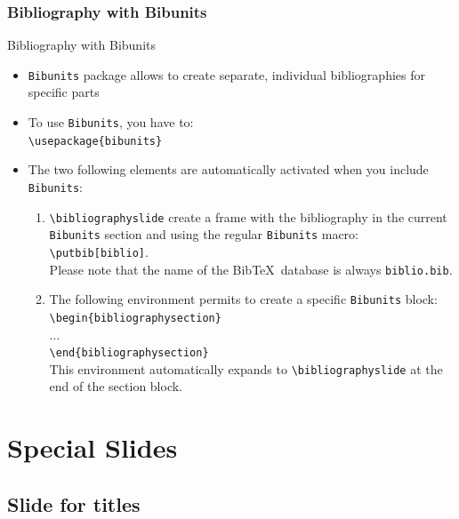 \documentclass[english,sectioncirclenumberstyle]{ciadbeamer}
\begin{document}
\subsubsection{Bibliography with Bibunits}

\begin{frame}{Bibliography with Bibunits}
	\begin{itemize}
	\item \texttt{Bibunits} package allows to create separate, individual bibliographies for specific parts
	\item To use \texttt{Bibunits}, you have to: \\
		\texttt{{\textbackslash}usepackage\{bibunits\}}
	\item The two following elements are automatically activated when you include \texttt{Bibunits}:
		\begin{enumerate}
		\item \texttt{{\textbackslash}bibliographyslide} create a frame with the bibliography in the current \texttt{Bibunits} section and using the regular \texttt{Bibunits} macro: \texttt{{\textbackslash}putbib[biblio]}. \\
			Please note that the name of the Bib\TeX\ database is always \texttt{biblio.bib}.
		\item The following environment permits to create a specific \texttt{Bibunits} block: \\
			\texttt{{\textbackslash}begin\{bibliographysection\}} \\
			... \\
			\texttt{{\textbackslash}end\{bibliographysection\}} \\
			This environment automatically expands to \texttt{{\textbackslash}bibliographyslide} at the end of the section block.
		\end{enumerate}
	\end{itemize}
\end{frame}


\section{Special Slides}
\sectiontableofcontentslide

\subsection{Slide for titles}
\subsectiontableofcontentslide
\end{document}
